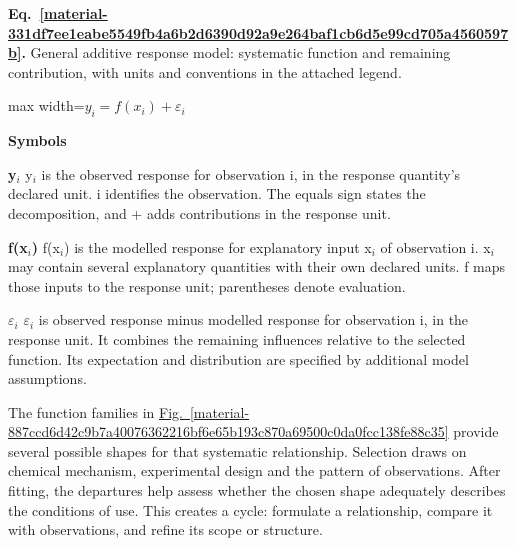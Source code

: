 \documentclass[11pt,a4paper]{article}
\begin{document}
\par\medskip
\noindent\begin{minipage}{\linewidth}
\label{material-331df7ee1eabe5549fb4a6b2d6390d92a9e264baf1cb6d5e99cd705a4560597b}
\noindent\textbf{Eq.~\ref*{material-331df7ee1eabe5549fb4a6b2d6390d92a9e264baf1cb6d5e99cd705a4560597b}.} General additive response model: systematic function and remaining contribution, with units and conventions in the attached legend.\par\nopagebreak
\begin{center}\begin{adjustbox}{max width=\linewidth}$\displaystyle y_i = f(x_i) + \varepsilon_i$\end{adjustbox}\end{center}

\par\noindent\textbf{Symbols}

\par\noindent\textbf{y\ensuremath{{}_i}} y\ensuremath{{}_i} is the observed response for observation i, in the response quantity's declared unit. i identifies the observation. The equals sign states the decomposition, and + adds contributions in the response unit.

\par\noindent\textbf{f(x\ensuremath{{}_i})} f(x\ensuremath{{}_i}) is the modelled response for explanatory input x\ensuremath{{}_i} of observation i. x\ensuremath{{}_i} may contain several explanatory quantities with their own declared units. f maps those inputs to the response unit; parentheses denote evaluation.

\par\noindent\textbf{\ensuremath{\varepsilon}\ensuremath{{}_i}} \ensuremath{\varepsilon}\ensuremath{{}_i} is observed response minus modelled response for observation i, in the response unit. It combines the remaining influences relative to the selected function. Its expectation and distribution are specified by additional model assumptions.

\end{minipage}\par
\medskip

The function families in \hyperref[material-887ccd6d42c9b7a40076362216bf6e65b193c870a69500c0da0fcc138fe88c35]{Fig.~\ref*{material-887ccd6d42c9b7a40076362216bf6e65b193c870a69500c0da0fcc138fe88c35}} provide several possible shapes for that systematic relationship. Selection draws on chemical mechanism, experimental design and the pattern of observations. After fitting, the departures help assess whether the chosen shape adequately describes the conditions of use. This creates a cycle: formulate a relationship, compare it with observations, and refine its scope or structure.
\end{document}

